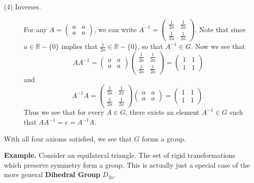 \begin{description}
        \item[(4) Inverses.] For any $A = 
        \begin{pmatrix}
            a & a\\
            a & a
        \end{pmatrix}$, we can write $A^{-1} = 
        \begin{pmatrix}
            \frac{1}{2a} & \frac{1}{2a}\\
            \frac{1}{2a} & \frac{1}{2a}
        \end{pmatrix}$. Note that since $a \in \mathbb{R} -\{0\}$
        implies that $\frac{1}{2a} \in \mathbb{R} - \{0\}$, so that
        $A^{-1} \in G$. Now we see that 
        \[
            AA^{-1} 
            = 
            \begin{pmatrix}
                a & a\\
                a & a
            \end{pmatrix}
            \begin{pmatrix}
                \frac{1}{2a} & \frac{1}{2a}\\
                \frac{1}{2a} & \frac{1}{2a}
            \end{pmatrix}
            = 
            \begin{pmatrix}
                1& 1\\
                1 & 1
            \end{pmatrix}
        \]
        and 
        \[
            A^{-1}A =
            \begin{pmatrix}
                \frac{1}{2a} & \frac{1}{2a}\\
                \frac{1}{2a} & \frac{1}{2a}
            \end{pmatrix}  
            \begin{pmatrix}
                a & a\\
                a & a
            \end{pmatrix}
            = 
            \begin{pmatrix}
                1& 1\\
                1 & 1
            \end{pmatrix}.
        \]
        Thus we see that for every $A \in G$, there exists an element
        $A^{-1} \in G$ such that $AA^{-1} = e = A^{-1}A$.
    \end{description}
    With all four axioms satisfied, we see that $G$ forms a group.

    \textbf{Example.} Consider an equilateral triangle. The set of rigid transformations
    which preserve symmetry form a group. This is actually just a
    special case of the more general \textbf{Dihedral Group} $D_{2n}$.


